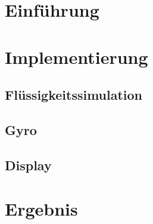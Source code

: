 \documentclass[12pt, a4paper]{book}
\begin{document}
\pagestyle{fancy}






\clearpage
\chapter{Einführung}
\label{chap:einfuehrung}


\chapter{Implementierung}

\section{Flüssigkeitssimulation}

\section{Gyro}

\section{Display}


\chapter{Ergebnis}


\clearpage




\end{document}

